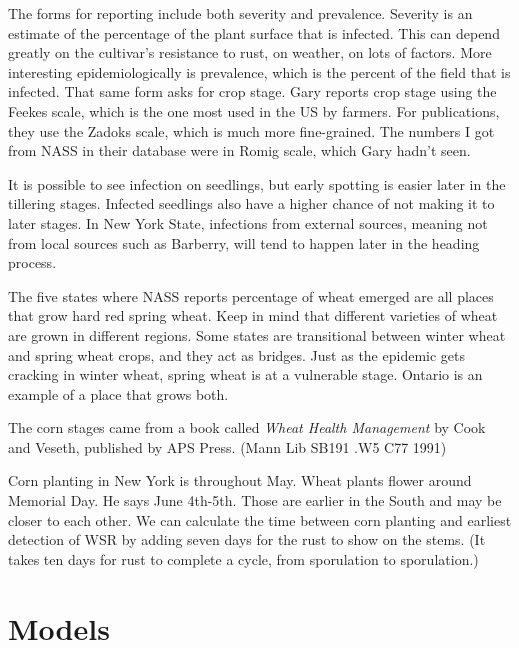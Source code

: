 \documentclass{article}
\begin{document}
The forms for reporting include both severity and prevalence. Severity is an estimate of the percentage of the plant surface that is infected. This can depend greatly on the cultivar's resistance to rust, on weather, on lots of factors. More interesting epidemiologically is prevalence, which is the percent of the field that is infected. That same form asks for crop stage. Gary reports crop stage using the Feekes scale, which is the one most used in the US by farmers. For publications, they use the Zadoks scale, which is much more fine-grained. The numbers I got from NASS in their database were in Romig scale, which Gary hadn't seen.

It is possible to see infection on seedlings, but early spotting is easier later in the tillering stages. Infected seedlings also have a higher chance of not making it to later stages. In New York State, infections from external sources, meaning not from local sources such as Barberry, will tend to happen later in the heading process.

The five states where NASS reports percentage of wheat emerged are all places that grow hard red spring wheat. Keep in mind that different varieties of wheat are grown in different regions. Some states are transitional between winter wheat and spring wheat crops, and they act as bridges. Just as the epidemic gets cracking in winter wheat, spring wheat is at a vulnerable stage. Ontario is an example of a place that grows both.

The corn stages came from a book called \emph{Wheat Health Management} by Cook and Veseth, published by APS Press. (Mann Lib SB191 .W5 C77 1991)

Corn planting in New York is throughout May. Wheat plants flower around Memorial Day. He says June 4th-5th. Those are earlier in the South and may be closer to each other. We can calculate the time between corn planting and earliest detection of WSR by adding seven days for the rust to show on the stems. (It takes ten days for rust to complete a cycle, from sporulation to sporulation.)


\section{Models}
\end{document}
